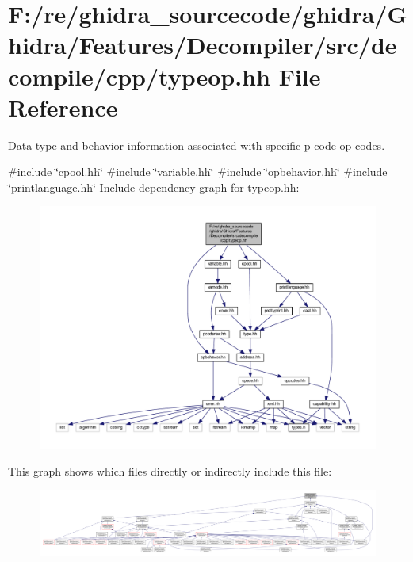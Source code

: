 \hypertarget{typeop_8hh}{}\section{F\+:/re/ghidra\+\_\+sourcecode/ghidra/\+Ghidra/\+Features/\+Decompiler/src/decompile/cpp/typeop.hh File Reference}
\label{typeop_8hh}


Data-\/type and behavior information associated with specific p-\/code op-\/codes.  


{\ttfamily \#include \char`\"{}cpool.\+hh\char`\"{}}\newline
{\ttfamily \#include \char`\"{}variable.\+hh\char`\"{}}\newline
{\ttfamily \#include \char`\"{}opbehavior.\+hh\char`\"{}}\newline
{\ttfamily \#include \char`\"{}printlanguage.\+hh\char`\"{}}\newline
Include dependency graph for typeop.\+hh\+:
\nopagebreak
\begin{figure}[H]
\begin{center}
\leavevmode
\includegraphics[width=350pt]{typeop_8hh__incl}
\end{center}
\end{figure}
This graph shows which files directly or indirectly include this file\+:
\nopagebreak
\begin{figure}[H]
\begin{center}
\leavevmode
\includegraphics[width=350pt]{typeop_8hh__dep__incl}
\end{center}
\end{figure}
